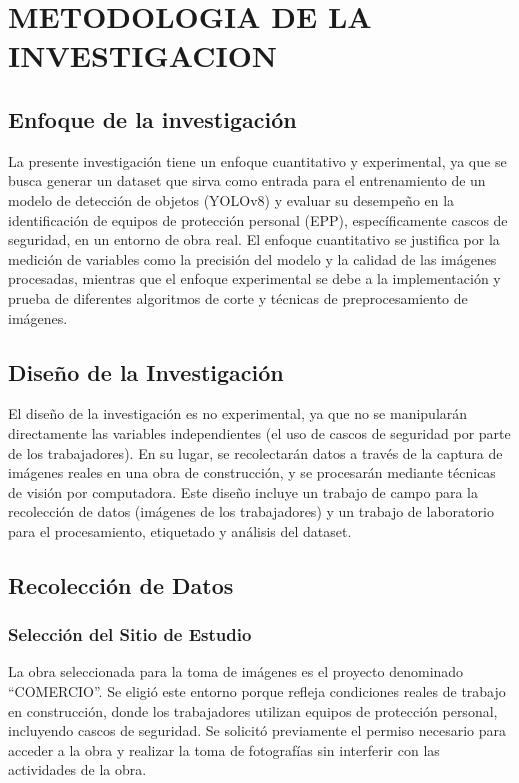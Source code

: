 \chapter{METODOLOGIA DE LA INVESTIGACION}

\section{Enfoque de la investigación}

La presente investigación tiene un enfoque cuantitativo y experimental, ya que se busca generar un dataset que sirva como entrada para el entrenamiento de un modelo de detección de objetos (YOLOv8) y evaluar su desempeño en la identificación de equipos de protección personal (EPP), específicamente cascos de seguridad, en un entorno de obra real. El enfoque cuantitativo se justifica por la medición de variables como la precisión del modelo y la calidad de las imágenes procesadas, mientras que el enfoque experimental se debe a la implementación y prueba de diferentes algoritmos de corte y técnicas de preprocesamiento de imágenes.

\section{Diseño de la Investigación}

El diseño de la investigación es no experimental, ya que no se manipularán directamente las variables independientes (el uso de cascos de seguridad por parte de los trabajadores). En su lugar, se recolectarán datos a través de la captura de imágenes reales en una obra de construcción, y se procesarán mediante técnicas de visión por computadora. Este diseño incluye un trabajo de campo para la recolección de datos (imágenes de los trabajadores) y un trabajo de laboratorio para el procesamiento, etiquetado y análisis del dataset.

\section{Recolección de Datos}

\subsection{Selección del Sitio de Estudio}

La obra seleccionada para la toma de imágenes es el proyecto denominado ``COMERCIO''. Se eligió este entorno porque refleja condiciones reales de trabajo en construcción, donde los trabajadores utilizan equipos de protección personal, incluyendo cascos de seguridad. Se solicitó previamente el permiso necesario para acceder a la obra y realizar la toma de fotografías sin interferir con las actividades de la obra.

